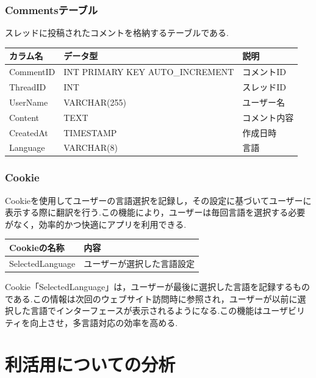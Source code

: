 \documentclass[b5paper,12pt]{jsreport}
\begin{document}
\subsection*{Commentsテーブル}

スレッドに投稿されたコメントを格納するテーブルである.

\begin{adjustbox}{width=\textwidth,center}
	\begin{tabular}{lll}
	\toprule
	\textbf{カラム名} & \textbf{データ型} & \textbf{説明} \\
	\midrule
	CommentID  & INT PRIMARY KEY AUTO\_INCREMENT & コメントID \\
	ThreadID   & INT & スレッドID \\
	UserName   & VARCHAR(255) & ユーザー名 \\
	Content    & TEXT & コメント内容 \\
	CreatedAt  & TIMESTAMP & 作成日時 \\
	Language   & VARCHAR(8) & 言語 \\
	\bottomrule
	\end{tabular}
\end{adjustbox}

\subsection*{Cookie}

Cookieを使用してユーザーの言語選択を記録し，その設定に基づいてユーザーに表示する際に翻訳を行う.この機能により，ユーザーは毎回言語を選択する必要がなく，効率的かつ快適にアプリを利用できる.

\begin{adjustbox}{width=\textwidth,center}
    \begin{tabular}{ll}
    \toprule
    \textbf{Cookieの名称} & \textbf{内容} \\
    \midrule
    SelectedLanguage & ユーザーが選択した言語設定 \\
    \bottomrule
    \end{tabular}
\end{adjustbox}

Cookie「SelectedLanguage」は，ユーザーが最後に選択した言語を記録するものである.この情報は次回のウェブサイト訪問時に参照され，ユーザーが以前に選択した言語でインターフェースが表示されるようになる.この機能はユーザビリティを向上させ，多言語対応の効率を高める.


\chapter{利活用についての分析}
\end{document}
